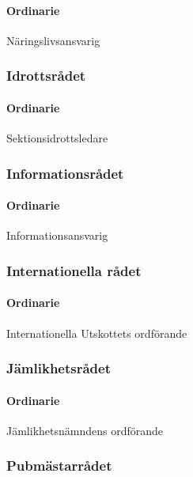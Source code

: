 \documentclass{dgovdoc}
\begin{document}
\paragraph{Ordinarie}

Näringslivsansvarig

\subsubsection{Idrottsrådet}

\paragraph{Ordinarie}

Sektionsidrottsledare

\subsubsection{Informationsrådet}

\paragraph{Ordinarie}

Informationsansvarig

\subsubsection{Internationella rådet}

\paragraph{Ordinarie}

Internationella Utskottets ordförande

\subsubsection{Jämlikhetsrådet}

\paragraph{Ordinarie}

Jämlikhetsnämndens ordförande

\subsubsection{Pubmästarrådet}
\end{document}
